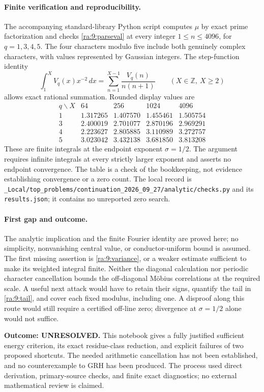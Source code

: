 \documentclass[11pt]{article}
\begin{document}
\paragraph{Finite verification and reproducibility.}
The accompanying standard-library Python script computes $\mu$ by exact
prime factorization and checks \eqref{ra:9:parseval} at every integer
$1\le n\le4096$, for $q=1,3,4,5$. The four characters modulo five include
both genuinely complex characters, with values represented by Gaussian
integers. The step-function identity
\[
 \int_1^X V_q(x)x^{-2}\,dx
     =\sum_{n=1}^{X-1}\frac{V_q(n)}{n(n+1)}
 \qquad(X\in\mathbb Z,\ X\ge2)
\]
allows exact rational summation. Rounded display values are
\[
\begin{array}{c|rrrr}
q\backslash X&64&256&1024&4096\\\hline
1&1.317265&1.407570&1.455461&1.505754\\
3&2.400019&2.701077&2.870196&2.969291\\
4&2.223627&2.805885&3.110989&3.272757\\
5&3.023042&3.432138&3.681850&3.813208
\end{array}
\]
These are finite integrals at the endpoint exponent $\sigma=1/2$.
The argument requires infinite integrals at every strictly larger
exponent and asserts no endpoint convergence. The table is a check of
the bookkeeping, not evidence establishing convergence or a zero count.
The local record is
\texttt{\_Local/top\_problems/continuation\_2026\_09\_27/analytic/checks.py}
and its \texttt{results.json}; it contains no unreported zero search.

\paragraph{First gap and outcome.}
The analytic implication and the finite Fourier identity are proved here;
no simplicity, nonvanishing central value, or conductor-uniform bound is
assumed. The first missing assertion is \eqref{ra:9:variance}, or a
weaker estimate sufficient to make its weighted integral finite. Neither
the diagonal calculation nor periodic character cancellation bounds the
off-diagonal M\"obius correlations at the required scale. A useful next
attack would have to retain their signs, quantify the tail in
\eqref{ra:9:tail}, and cover each fixed modulus, including one. A disproof
along this route would still require a certified off-line zero; divergence
at $\sigma=1/2$ alone would not suffice.

\textbf{Outcome: UNRESOLVED.} This notebook gives a fully justified
sufficient energy criterion, its exact residue-class reduction, and
explicit failures of two proposed shortcuts. The needed arithmetic
cancellation has not been established, and no counterexample to GRH has
been produced. The process used direct derivation, primary-source checks,
and finite exact diagnostics; no external mathematical review is claimed.
\end{document}
